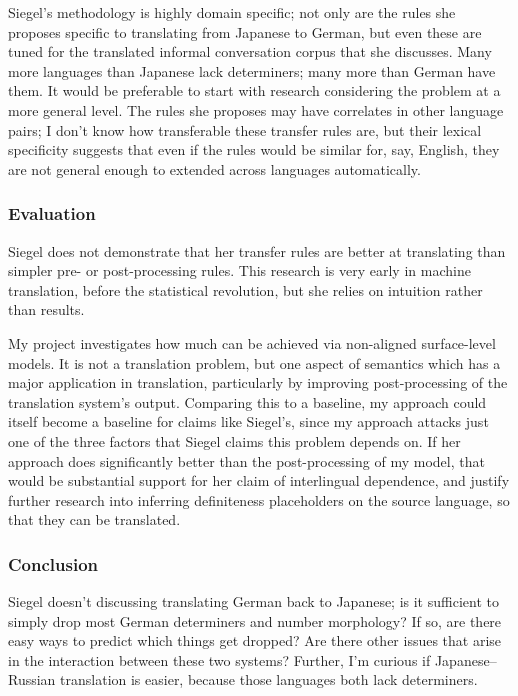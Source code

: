 \documentclass[11pt]{article}
\begin{document}
Siegel's methodology is highly domain specific; not only are the rules she proposes specific to translating from Japanese to German, but even these are tuned for the translated informal conversation corpus that she discusses.
Many more languages than Japanese lack determiners; many more than German have them. It would be preferable to start with research considering the problem at a more general level. The rules she proposes may have correlates in other language pairs; I don't know how transferable these transfer rules are, but their lexical specificity suggests that even if the rules would be similar for, say, English, they are not general enough to extended across languages automatically.

\subsubsection*{Evaluation}

Siegel does not demonstrate that her transfer rules are better at translating than simpler pre- or post-processing rules. This research is very early in machine translation, before the statistical revolution, but she relies on intuition rather than results.

My project investigates how much can be achieved via non-aligned surface-level models. It is not a translation problem, but one aspect of semantics which has a major application in translation, particularly by improving post-processing of the translation system's output. Comparing this to a baseline, my approach could itself become a baseline for claims like Siegel's, since my approach attacks just one of the three factors that Siegel claims this problem depends on. If her approach does significantly better than the post-processing of my model, that would be substantial support for her claim of interlingual dependence, and justify further research into inferring definiteness placeholders on the source language, so that they can be translated.


\subsubsection*{Conclusion}

Siegel doesn't discussing translating German back to Japanese; is it sufficient to simply drop most German determiners and number morphology? If so, are there easy ways to predict which things get dropped? Are there other issues that arise in the interaction between these two systems? Further, I'm curious if Japanese--Russian translation is easier, because those languages both lack determiners.
\end{document}
